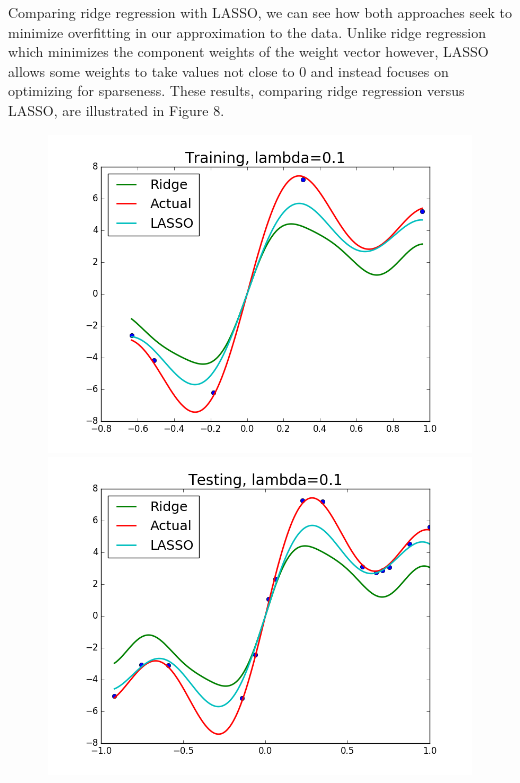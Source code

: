 \documentclass{article}
\begin{document}
Comparing ridge regression with LASSO, we can see how both approaches seek to minimize overfitting in our approximation to the data. Unlike ridge regression which minimizes the component weights of the weight vector however, LASSO allows some weights to take values not close to 0 and instead focuses on optimizing for sparseness. These results, comparing ridge regression versus LASSO, are illustrated in Figure 8.

\begin{figure}[width=\linewidth]
\centering
\begin{multicols}{2}
  \includegraphics[width=1.2\linewidth]{code/P4/training,ridge.png}
  \includegraphics[width=1.2\linewidth]{code/P4/testing,ridge.png}

\end{multicols}
\end{figure}
\end{document}
